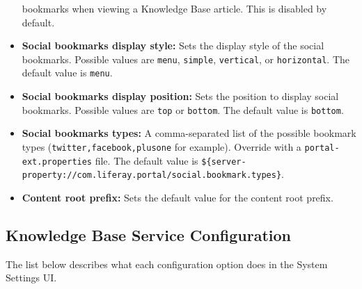 \begin{itemize}
  bookmarks when viewing a Knowledge Base article. This is disabled by
  default.
\item
  \textbf{Social bookmarks display style:} Sets the display style of the
  social bookmarks. Possible values are \texttt{menu}, \texttt{simple},
  \texttt{vertical}, or \texttt{horizontal}. The default value is
  \texttt{menu}.
\item
  \textbf{Social bookmarks display position:} Sets the position to
  display social bookmarks. Possible values are \texttt{top} or
  \texttt{bottom}. The default value is \texttt{bottom}.
\item
  \textbf{Social bookmarks types:} A comma-separated list of the
  possible bookmark types (\texttt{twitter,facebook,plusone} for
  example). Override with a \texttt{portal-ext.properties} file. The
  default value is
  \texttt{\$\{server-property://com.liferay.portal/social.bookmark.types\}}.
\item
  \textbf{Content root prefix:} Sets the default value for the content
  root prefix.
\end{itemize}

\subsection{Knowledge Base Service
Configuration}\label{knowledge-base-service-configuration}

The list below describes what each configuration option does in the
System Settings UI.


